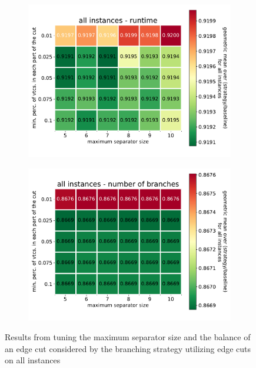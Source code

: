 \documentclass[12pt,a4paper,twoside]{scrartcl}
\numberwithin{equation}{section}
\begin{document}
\begin{figure}[htb!]
	\centering	
	\begin{subfigure}{0.475\textwidth}
		\includegraphics[width=\textwidth]{images/plots/st_tune_all_t}
	\end{subfigure}
	\begin{subfigure}{0.475\textwidth}
		\includegraphics[width=\textwidth]{images/plots/st_tune_all_b}
	\end{subfigure}
	\caption{Results from tuning the maximum separator size and the balance of an edge cut considered by the branching strategy utilizing edge cuts on all instances}	
	\label{st3}
	
\end{figure}
\FloatBarrier
\end{document}
